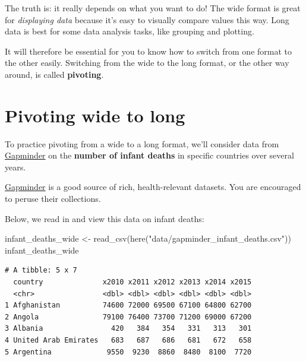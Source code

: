 \documentclass[
  letterpaper,
  DIV=11,
  numbers=noendperiod]{scrreprt}
\newenvironment{Shaded}{\begin{snugshade}}{\end{snugshade}}
\newcommand{\FunctionTok}[1]{\textcolor[rgb]{0.28,0.35,0.67}{#1}}
\newcommand{\NormalTok}[1]{\textcolor[rgb]{0.00,0.23,0.31}{#1}}
\newcommand{\OtherTok}[1]{\textcolor[rgb]{0.00,0.23,0.31}{#1}}
\newcommand{\StringTok}[1]{\textcolor[rgb]{0.13,0.47,0.30}{#1}}
\begin{document}
The truth is: it really depends on what you want to do! The wide format
is great for \emph{displaying data} because it's easy to visually
compare values this way. Long data is best for some data analysis tasks,
like grouping and plotting.

It will therefore be essential for you to know how to switch from one
format to the other easily. Switching from the wide to the long format,
or the other way around, is called \textbf{pivoting}.

\section{Pivoting wide to long}\label{pivoting-wide-to-long}

To practice pivoting from a wide to a long format, we'll consider data
from \href{https://www.gapminder.org}{Gapminder} on the \textbf{number
of infant deaths} in specific countries over several years.

\begin{tcolorbox}[enhanced jigsaw, titlerule=0mm, colback=white, left=2mm, breakable, opacitybacktitle=0.6, colbacktitle=quarto-callout-note-color!10!white, colframe=quarto-callout-note-color-frame, bottomtitle=1mm, opacityback=0, coltitle=black, arc=.35mm, toptitle=1mm, title=\textcolor{quarto-callout-note-color}{\faInfo}\hspace{0.5em}{Side Note}, leftrule=.75mm, toprule=.15mm, bottomrule=.15mm, rightrule=.15mm]

\href{https://www.gapminder.org}{Gapminder} is a good source of rich,
health-relevant datasets. You are encouraged to peruse their
collections.

\end{tcolorbox}

Below, we read in and view this data on infant deaths:

\begin{Shaded}
\begin{Highlighting}[]
\NormalTok{infant\_deaths\_wide }\OtherTok{\textless{}{-}} \FunctionTok{read\_csv}\NormalTok{(}\FunctionTok{here}\NormalTok{(}\StringTok{"data/gapminder\_infant\_deaths.csv"}\NormalTok{))}
\NormalTok{infant\_deaths\_wide}
\end{Highlighting}
\end{Shaded}

\begin{verbatim}
# A tibble: 5 x 7
  country              x2010 x2011 x2012 x2013 x2014 x2015
  <chr>                <dbl> <dbl> <dbl> <dbl> <dbl> <dbl>
1 Afghanistan          74600 72000 69500 67100 64800 62700
2 Angola               79100 76400 73700 71200 69000 67200
3 Albania                420   384   354   331   313   301
4 United Arab Emirates   683   687   686   681   672   658
5 Argentina             9550  9230  8860  8480  8100  7720
\end{verbatim}
\end{document}
